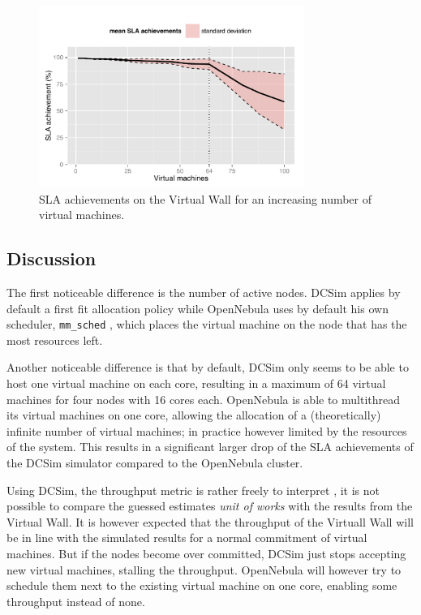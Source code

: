 \documentclass[conference, 10pt]{IEEEtran}
\begin{document}
\begin{figure}
\centering
\includegraphics[width=3.4in]{includes/OpenNebula_SLA}
\caption{SLA achievements on the Virtual Wall for an increasing number of virtual machines.}
\label{fig:opennebula:sla}
\end{figure}



\subsection{Discussion}
The first noticeable difference is the number of active nodes. DCSim applies by default a first fit allocation policy while OpenNebula uses by default his own scheduler, \texttt{mm\_sched} \cite{mmsched}, which places the virtual machine on the node that has the most resources left.

Another noticeable difference is that by default, DCSim only seems to be able to host one virtual machine on each core, resulting in a maximum of 64 virtual machines for four nodes with 16 cores each. OpenNebula is able to multithread its virtual machines on one core, allowing the allocation of a (theoretically) infinite number of virtual machines; in practice however limited by the resources of the system. This results in a significant larger drop of the SLA achievements of the DCSim simulator compared to the OpenNebula cluster.

Using DCSim, the throughput metric is rather freely to interpret , it is not possible to compare the guessed estimates \emph{unit of works} with the results from the Virtual Wall. It is however expected that the throughput of the Virtuall Wall will be in line with the simulated results for a normal commitment of virtual machines. But if the nodes become over committed, DCSim just stops accepting new virtual machines, stalling the throughput. OpenNebula will however try to schedule them next to the existing virtual machine on one core, enabling some throughput instead of none.
 
\end{document}
